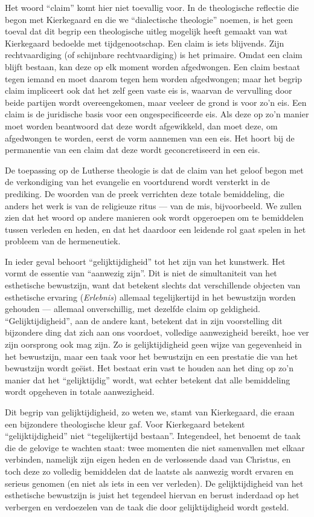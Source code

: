 Het woord ``claim'' komt hier niet toevallig voor. In de theologische reflectie die begon met Kierkegaard en die we ``dialectische theologie'' noemen, is het geen toeval dat dit begrip een theologische uitleg mogelijk heeft gemaakt van wat Kierkegaard bedoelde met tijdgenootschap. Een claim is iets blijvends. Zijn rechtvaardiging (of schijnbare rechtvaardiging) is het primaire. Omdat een claim blijft bestaan, kan deze op elk moment worden afgedwongen. Een claim bestaat tegen iemand en moet daarom tegen hem worden afgedwongen; maar het begrip claim impliceert ook dat het zelf geen vaste eis is, waarvan de vervulling door beide partijen wordt overeengekomen, maar veeleer de grond is voor zo’n eis. Een claim is de juridische basis voor een ongespecificeerde eis. Als deze op zo’n manier moet worden beantwoord dat deze wordt afgewikkeld, dan moet deze, om afgedwongen te worden, eerst de vorm aannemen van een eis. Het hoort bij de permanentie van een claim dat deze wordt geconcretiseerd in een eis.

De toepassing op de Lutherse theologie is dat de claim van het geloof begon met de verkondiging van het evangelie en voortdurend wordt versterkt in de prediking. De woorden van de preek verrichten deze totale bemiddeling, die anders het werk is van de religieuze ritus — van de mis, bijvoorbeeld. We zullen zien dat het woord op andere manieren ook wordt opgeroepen om te bemiddelen tussen verleden en heden, en dat het daardoor een leidende rol gaat spelen in het probleem van de hermeneutiek.

In ieder geval behoort ``gelijktijdigheid'' tot het zijn van het kunstwerk. Het vormt de essentie van ``aanwezig zijn''. Dit is niet de simultaniteit van het esthetische bewustzijn, want dat betekent slechts dat verschillende objecten van esthetische ervaring (\textit{Erlebnis}) allemaal tegelijkertijd in het bewustzijn worden gehouden — allemaal onverschillig, met dezelfde claim op geldigheid. ``Gelijktijdigheid'', aan de andere kant, betekent dat in zijn voorstelling dit bijzondere ding dat zich aan ons voordoet, volledige aanwezigheid bereikt, hoe ver zijn oorsprong ook mag zijn. Zo is gelijktijdigheid geen wijze van gegevenheid in het bewustzijn, maar een taak voor het bewustzijn en een prestatie die van het bewustzijn wordt geëist. Het bestaat erin vast te houden aan het ding op zo’n manier dat het ``gelijktijdig'' wordt, wat echter betekent dat alle bemiddeling wordt opgeheven in totale aanwezigheid.

Dit begrip van gelijktijdigheid, zo weten we, stamt van Kierkegaard, die eraan een bijzondere theologische kleur gaf. Voor Kierkegaard betekent ``gelijktijdigheid'' niet ``tegelijkertijd bestaan''. Integendeel, het benoemt de taak die de gelovige te wachten staat: twee momenten die niet samenvallen met elkaar verbinden, namelijk zijn eigen heden en de verlossende daad van Christus, en toch deze zo volledig bemiddelen dat de laatste als aanwezig wordt ervaren en serieus genomen (en niet als iets in een ver verleden). De gelijktijdigheid van het esthetische bewustzijn is juist het tegendeel hiervan en berust inderdaad op het verbergen en verdoezelen van de taak die door gelijktijdigheid wordt gesteld.

